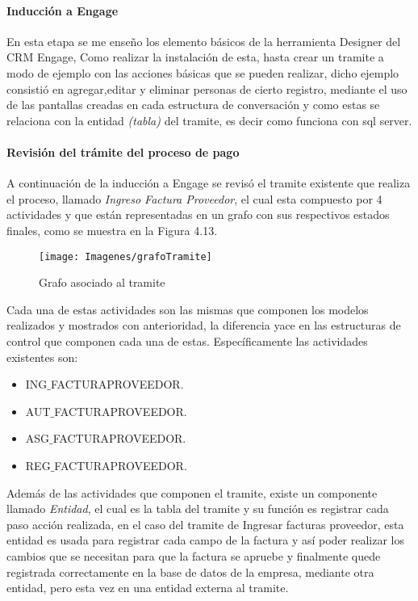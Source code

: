 		\paragraph{Inducción a Engage}
		En esta etapa se me enseño los elemento básicos de la herramienta Designer del CRM Engage, Como realizar la instalación de esta, hasta crear un tramite a modo de ejemplo con las acciones básicas que se pueden realizar, dicho ejemplo consistió en agregar,editar y eliminar personas de cierto registro, mediante el uso de las pantallas creadas en cada estructura de conversación y como estas se relaciona con la entidad \textit{(tabla)} del tramite, es decir como funciona con sql server.
		
		\paragraph{Revisión del trámite del proceso de pago}
		A continuación de la inducción a Engage se revisó el tramite existente que realiza el proceso, llamado \textit{Ingreso Factura Proveedor}, el cual esta compuesto por 4 actividades y que están representadas en un grafo con sus respectivos estados finales, como se muestra en la Figura 4.13.

		\begin{figure}[H]
			\centering
			\texttt{[image: Imagenes/grafoTramite]}
			\caption{Grafo asociado al tramite}
		\end{figure}
		
		Cada una de estas actividades son las mismas que componen los modelos realizados y mostrados con anterioridad, la diferencia yace en las estructuras de control que componen cada una de estas. Específicamente las actividades existentes son:
		
		\begin{itemize}
			\item ING$\_$FACTURAPROVEEDOR.
			\item AUT$\_$FACTURAPROVEEDOR.
			\item ASG$\_$FACTURAPROVEEDOR.
			\item REG$\_$FACTURAPROVEEDOR.
		\end{itemize}

	Además de las actividades que componen el tramite, existe un componente llamado \textit{Entidad}, el cual es la tabla del tramite y su función es registrar cada paso acción realizada, en el caso del tramite de Ingresar facturas proveedor, esta entidad es usada para registrar cada campo de la factura y así poder realizar los cambios que se necesitan para que la factura se apruebe y finalmente quede registrada correctamente en la base de datos de la empresa, mediante otra entidad, pero esta vez en una entidad externa al tramite. 
		
